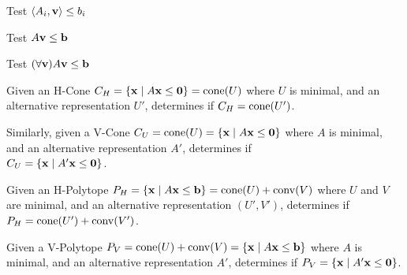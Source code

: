 Test $\left\langle A_i, \mathbf{v} \right\rangle \leq b_i$
\lstvecsatisfieda

Test $A\mathbf{v} \leq \mathbf{b}$
\lstvecsatisfiedb

Test $(\forall \mathbf{v}) A\mathbf{v} \leq \mathbf{b}$
\lstvecssatisfied

Given an H-Cone $C_H = \left\{\mathbf{x}\;|\; A\mathbf{x}\leq\mathbf{0}\right\} = \operatorname{cone}(U)$ where $U$ is minimal, and an alternative representation $U'$, determines if $C_H = \operatorname{cone}(U')$.

Similarly, given a V-Cone $C_U = \operatorname{cone}(U) = \left\{\mathbf{x}\;|\; A\mathbf{x}\leq\mathbf{0}\right\}$ where $A$ is minimal, and an alternative representation $A'$, determines if \\
$C_U = \left\{\mathbf{x}\;|\; A'\mathbf{x}\leq\mathbf{0}\right\}$.
\lstequivalentconerep

Given an H-Polytope $P_H = \left\{\mathbf{x}\;|\; A\mathbf{x}\leq\mathbf{b}\right\} = \operatorname{cone}(U) + \operatorname{conv}(V)$ where $U$ and $V$ are minimal, and an alternative representation $(U',V')$, determines if $P_H = \operatorname{cone}(U') + \operatorname{conv}(V')$.
\lstequivalenthpolyrep

Given a V-Polytope $P_V = \operatorname{cone}(U) + \operatorname{conv}(V) = \left\{\mathbf{x}\;|\; A\mathbf{x}\leq\mathbf{b}\right\}$ where $A$ is minimal, and an alternative representation $A'$, determines if $P_V = \left\{\mathbf{x}\;|\; A'\mathbf{x}\leq\mathbf{0}\right\}$.
\lstequivalentvpolyrep



